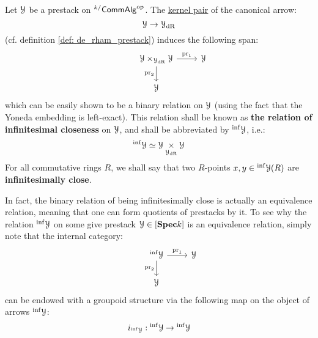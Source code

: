                 \begin{definition} \label{def: infinitesimally_closed_points}
                    Let $\mathcal{Y}$ be a prestack on ${}^{k/}\mathsf{Comm}\mathsf{Alg}^{\mathrm{op}}$. The \href{https://ncatlab.org/nlab/show/kernel+pair}{\underline{kernel pair}} of the canonical arrow:
                        $$\mathcal{Y} \to \mathcal{Y}_{\mathrm{dR}}$$
                    (cf. definition \ref{def: de_rham_prestack}) induces the following span:
                        $$
                            \begin{tikzcd}
                            	{} & {\calY \x_{\calY_{\dR}} \calY} & \calY \\
                            	& \calY
                            	\arrow["{\pr_2}"', from=1-2, to=2-2]
                            	\arrow["{\pr_1}", from=1-2, to=1-3]
                            \end{tikzcd}
                        $$
                    which can be easily shown to be a binary relation on $\mathcal{Y}$ (using the fact that the Yoneda embedding is left-exact). This relation shall be known as \textbf{the relation of infinitesimal closeness} on $\mathcal{Y}$, and shall be abbreviated by ${}^{\inf}\mathcal{Y}$, i.e.:
                        $${}^{\inf}\calY \cong \calY \x_{\calY_{\dR}} \calY$$
                    For all commutative rings $R$, we shall say that two $R$-points $x, y \in {}^{\inf}\mathcal{Y}(R)$ are \textbf{infinitesimally close}. 
                \end{definition}
                \begin{remark} \label{remark: infinitesimal_closeness}
                    In fact, the binary relation of being infinitesimally close is actually an equivalence relation, meaning that one can form quotients of prestacks by it. To see why the relation ${}^{\inf}\mathcal{Y}$ on some give prestack $\mathcal{Y} \in [\mathbf{Spec} k]$ is an equivalence relation, simply note that the internal category:
                        $$
                            \begin{tikzcd}
                            	{} & {{}^{\inf}\calY} & \calY \\
                            	& \calY
                            	\arrow["{\pr_2}"', from=1-2, to=2-2]
                            	\arrow["{\pr_1}", from=1-2, to=1-3]
                            \end{tikzcd}
                        $$
                    can be endowed with a groupoid structure via the following map on the object of arrows ${}^{\inf}\mathcal{Y}$:
                        $$i_{{}^{\inf}\mathcal{Y}}: {}^{\inf}\mathcal{Y} \to {}^{\inf}\mathcal{Y}$$
                    
                \end{remark}
